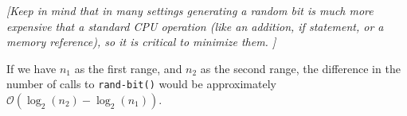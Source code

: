 \documentclass[11pt]{article}
\newcommand{\BigO}[1]{\mathcal{O}\left( #1 \right)}
\begin{document}
\emph{[Keep in mind that in many settings generating a random bit is much more expensive that a standard CPU operation (like an addition, if statement, or a memory reference), so it is critical to minimize them.  ]}


If we have $n_{1}$ as the first range, and $n_{2}$ as the second range, the difference in the number of calls to \verb~rand-bit()~ would be approximately $\BigO{ \log_{2}(n_{2}) - \log_{2}(n_{1})}$.

\vspace{-.1in}




\end{document}

